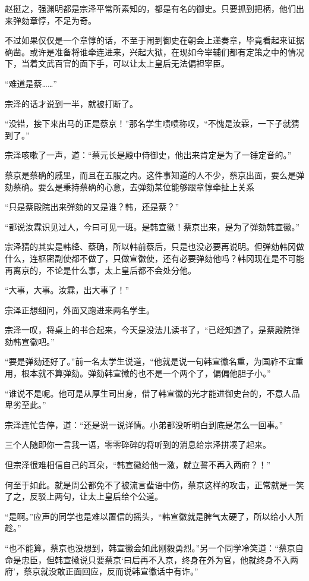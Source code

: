 赵挺之，强渊明都是宗泽平常所素知的，都是有名的御史。只要抓到把柄，他们出来弹劾章惇，不足为奇。

不过如果仅仅是一个章惇的话，不至于闹到御史在朝会上递奏章，毕竟看起来证据确凿。或许是准备将谁牵连进来，兴起大狱，在现如今宰辅们都有定策之中的情况下，当着文武百官的面下手，可以让太上皇后无法偏袒宰臣。

“难道是蔡……”

宗泽的话才说到一半，就被打断了。

“没错，接下来出马的正是蔡京！”那名学生啧啧称叹，“不愧是汝霖，一下子就猜到了。”

宗泽咳嗽了一声，道：“蔡元长是殿中侍御史，他出来肯定是为了一锤定音的。”

蔡京是蔡确的戚里，而且在五服之内。这件事知道的人不少，蔡京出面，要么是弹劾蔡确。要么是秉持蔡确的心意，去弹劾某位能够跟章惇牵扯上关系

“只是蔡殿院出来弹劾的又是谁？韩，还是蔡？”

“都说汝霖识见过人，今曰可见一斑。是韩宣徽！蔡京出来，是为了弹劾韩宣徽。”

宗泽猜的其实是韩绛、蔡确，所以韩前蔡后，只是也没必要再说明。但弹劾韩冈做什么，连枢密副使都不做了，只做宣徽使，还有必要弹劾他吗？韩冈现在是不可能再离京的，不论是什么事，太上皇后都不会处分他。

“大事，大事。汝霖，出大事了！”

宗泽正想细问，外面又跑进来两名学生。

宗泽一叹，将桌上的书合起来，今天是没法儿读书了，“已经知道了，是蔡殿院弹劾韩宣徽吧。”

“要是弹劾还好了。”前一名太学生说道，“他就是说一句韩宣徽名重，为国祚不宜重用，根本就不算弹劾。弹劾韩宣徽的也不是一个两个了，偏偏他胆子小。”

“谁说不是呢。他可是从厚生司出身，借了韩宣徽的光才能进御史台的，不意人品卑劣至此。”

宗泽连忙告停，道：“还是说一说详情。小弟都没听明白到底是怎么一回事。”

三个人随即你一言我一语，零零碎碎的将听到的消息给宗泽拼凑了起来。

但宗泽很难相信自己的耳朵，“韩宣徽给他一激，就立誓不再入两府？！”

何至于如此。就是周公都免不了被流言蜚语中伤，蔡京这样的攻击，正常就是一笑了之，反驳上两句，让太上皇后给个公道。

“是啊。”应声的同学也是难以置信的摇头，“韩宣徽就是脾气太硬了，所以给小人所趁。”

“也不能算，蔡京也没想到，韩宣徽会如此刚毅勇烈。”另一个同学冷笑道：“蔡京自命是忠臣，但韩宣徽说只要蔡京‘曰后再不入京，终身在外为官，他就终身不入两府’，蔡京就没敢正面回应，反而说韩宣徽话中有诈。”

